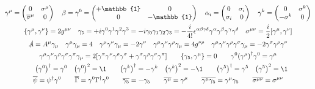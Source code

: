 \begin{gather*}
        \gamma^\mu = \begin{pmatrix}
                0                     &\sigma^\mu \\
                \overline{\sigma}^\mu &0          \\
        \end{pmatrix}
        \quad
        \beta = \gamma^0 = \begin{pmatrix}
                +\mathbb{1} &0           \\
                0           &-\mathbb{1} \\
        \end{pmatrix}
        \quad
        \alpha_i = \begin{pmatrix}
                0        &\sigma_i \\
                \sigma_i &0        \\
        \end{pmatrix}
        \quad
        \gamma^k = \begin{pmatrix}
                0         &\sigma^k \\
                -\sigma^k &0        \\
        \end{pmatrix}
        \\
        \acomm{\gamma^\mu}{\gamma^\nu} = 2g^{\mu\nu}
        \quad
        \gamma_5
        = +i\gamma^0\gamma^1\gamma^2\gamma^3
        = -i\gamma_0\gamma_1\gamma_2\gamma_3
        = -\frac{i}{4!}\epsilon^{\alpha\beta\gamma\delta} \gamma^\alpha\gamma^\beta\gamma^\gamma\gamma^\delta
        \quad
        \sigma^{\mu\nu} = \frac{i}{2}\comm{\gamma^\mu}{\gamma^\nu}
        \\
        \slashed{A} = A^\mu\gamma_\mu
        \quad
        \gamma^\mu\gamma_\mu = 4
        \quad
        \gamma^\mu\gamma^\nu\gamma_\mu = -2\gamma^\nu
        \quad
        \gamma^\mu\gamma^\nu\gamma^\rho\gamma_\mu = 4g^{\nu\rho}
        \quad
        \gamma^\mu\gamma^\nu\gamma^\rho\gamma^\sigma\gamma_\mu = -2\gamma^\sigma\gamma^\rho\gamma^\nu
        \\
        \gamma^\mu\gamma^\nu\gamma^\rho\gamma^\sigma\gamma^\pi\gamma_\mu = 2\qty[\gamma^\pi\gamma^\nu\gamma^\rho\gamma^\sigma + \gamma^\sigma\gamma^\rho\gamma^\nu\gamma^\pi]
        \qquad
        \acomm{\gamma_5}{\gamma^\mu} = 0
        \qquad
        \gamma^0\qty(\gamma^\mu)^\dagger\gamma^0 = \gamma^\mu
        \\
        \quad
        \qty(\gamma^0)^\dagger = \gamma^0
        \quad
        \qty(\gamma^0)^2 = \1
        \qquad
        \qty(\gamma^k)^\dagger = -\gamma^k
        \quad
        \qty(\gamma^k)^2 = -\1
        \qquad
        \qty(\gamma^5)^\dagger = \gamma^5
        \quad
        \qty(\gamma^5)^2 = \1
        \\
        \overline{\psi} = \psi^\dagger\gamma^0
        \qquad
        \overline{\Gamma} = \gamma^0\Gamma^\dagger\gamma^0
        \qquad
        \overline{\gamma_5} = -\gamma_5
        \qquad
        \overline{\gamma^\mu} = \gamma^\mu
        \qquad
        \overline{\gamma^\mu\gamma_5} = \gamma^\mu\gamma_5
        \qquad
        \overline{\sigma^{\mu\nu}} = \sigma^{\mu\nu}
\end{gather*}
